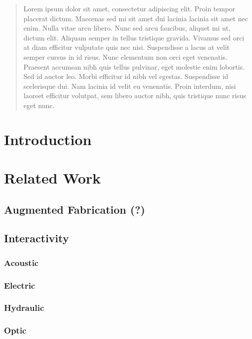   \maketitle

  \begin{abstract}
    Lorem ipsum dolor sit amet, consectetur adipiscing elit. Proin tempor placerat dictum. Maecenas sed mi sit amet dui lacinia lacinia sit amet nec enim. Nulla vitae arcu libero. Nunc sed arcu faucibus, aliquet mi ut, dictum elit. Aliquam semper in tellus tristique gravida. Vivamus sed orci at diam efficitur vulputate quis nec nisi. Suspendisse a lacus at velit semper cursus in id risus. Nunc elementum non orci eget venenatis. Praesent accumsan nibh quis tellus pulvinar, eget molestie enim lobortis. Sed id auctor leo. Morbi efficitur id nibh vel egestas. Suspendisse id scelerisque dui. Nam lacinia id velit eu venenatis. Proin interdum, nisi laoreet efficitur volutpat, sem libero auctor nibh, quis tristique nunc risus eget nunc.
  \end{abstract}

  \category{}{}{}
  \keywords{\plainkeywords}

  \section{Introduction}

  \section{Related Work}
    \subsection{Augmented Fabrication (?)}
    \subsection{Interactivity}
      \subsubsection{Acoustic}
      \subsubsection{Electric}
      \subsubsection{Hydraulic}
      \subsubsection{Optic}
